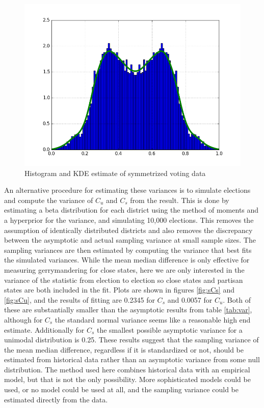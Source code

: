 \documentclass[preprint,12pt]{article}
\begin{document}
\begin{figure}[htb!]
    \begin{center}
        \includegraphics[scale=0.8]{../Figures/SimVsAsymptotic/Kde.png}
        \caption{Histogram and KDE estimate of symmetrized voting data}\label{fig:kde}
    \end{center}
\end{figure}

An alternative procedure for estimating these variances is to simulate elections and compute the variance of $C_{u}$ and $C_{s}$ from the result.
This is done by estimating a beta distribution for each district using the method of moments and a hyperprior for the variance, and simulating 10,000 elections.
This removes the assumption of identically distributed districts and also removes the discrepancy between the asymptotic and actual sampling variance at small sample sizes.
The sampling variances are then estimated by computing the variance that best fits the simulated variances.
While the mean median difference is only effective for measuring gerrymandering for close states, here we are only interested in the variance of the statistic from election to election so close states and partisan states are both included in the fit.
Plots are shown in figures \ref{fig:sCs} and \ref{fig:sCu}, and the results of fitting are 0.2345 for $C_{s}$ and 0.0057 for $C_{u}$.
Both of these are substantially smaller than the asymptotic results from table \ref{tab:var}, although for $C_{s}$ the standard normal variance seems like a reasonable high end estimate.
Additionally for $C_{s}$ the smallest possible asymptotic variance for a unimodal distribution is 0.25.
These results suggest that the sampling variance of the mean median difference, regardless if it is standardized or not, should be estimated from historical data rather than an asymptotic variance from some null distribution.
The method used here combines historical data with an empirical model, but that is not the only possibility.
More sophisticated models could be used, or no model could be used at all, and the sampling variance could be estimated directly from the data.
\end{document}
